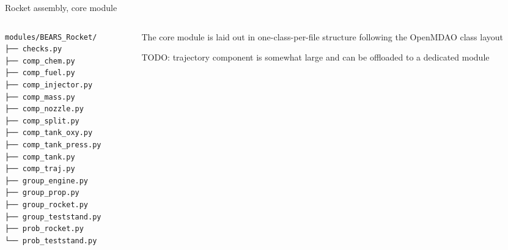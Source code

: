 \begin{frame}[fragile]{Rocket assembly, core module}
  \begin{columns}
    \begin{column}{0.30\textwidth}
      \begin{footnotesize}
      \begin{verbatim}
modules/BEARS_Rocket/
├── checks.py
├── comp_chem.py
├── comp_fuel.py
├── comp_injector.py
├── comp_mass.py
├── comp_nozzle.py
├── comp_split.py
├── comp_tank_oxy.py
├── comp_tank_press.py
├── comp_tank.py
├── comp_traj.py
├── group_engine.py
├── group_prop.py
├── group_rocket.py
├── group_teststand.py
├── prob_rocket.py
└── prob_teststand.py
      \end{verbatim}
      \end{footnotesize}
    \end{column}
    \hfill
    \begin{column}{0.50\textwidth}
      \justifying

      The core module is laid out in one-class-per-file structure following the
      OpenMDAO class layout

      \pause
      \vspace{\baselineskip}

      TODO: trajectory component is somewhat large and can be offloaded to a
      dedicated module
    \end{column}
  \end{columns}
\end{frame}
